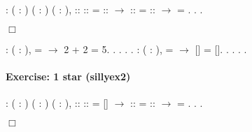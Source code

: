 \documentclass[12pt]{report}
\begin{document}
\begin{coqdoccode}
\coqdocnoindent
{}  : \coqdockw{\ensuremath{\forall}} ( : ) (   : ) (  :  ),\coqdoceol
\coqdocindent{2.50em}
 ::  ::  =  ::  \ensuremath{\rightarrow}\coqdoceol
\coqdocindent{2.50em}
 ::  =  ::  \ensuremath{\rightarrow}\coqdoceol
\coqdocindent{2.50em}
 = .\coqdoceol
\coqdocnoindent
{}.\coqdoceol
 .\coqdoceol
\end{coqdoccode}
\ensuremath{\Box} \begin{coqdoccode}
\coqdocemptyline
\coqdocnoindent
{}  : \coqdockw{\ensuremath{\forall}} ( : ),\coqdoceol
\coqdocindent{2.50em}
  =  \ensuremath{\rightarrow}\coqdoceol
\coqdocindent{2.50em}
2 + 2 = 5.\coqdoceol
\coqdocnoindent
{}.\coqdoceol
\coqdocindent{1.00em}
  .  . .\coqdoceol
\coqdocemptyline
\coqdocnoindent
{}  : \coqdockw{\ensuremath{\forall}} (  : ),\coqdoceol
\coqdocindent{2.50em}
 =  \ensuremath{\rightarrow}\coqdoceol
\coqdocindent{2.50em}
[] = [].\coqdoceol
\coqdocnoindent
{}.\coqdoceol
\coqdocindent{1.00em}
   .  . .\coqdoceol
\coqdocemptyline
\end{coqdoccode}
\paragraph{Exercise: 1 star (sillyex2)}

\begin{coqdoccode}
\coqdocnoindent
{}  : \coqdockw{\ensuremath{\forall}} ( : ) (   : ) (  :  ),\coqdoceol
\coqdocindent{2.50em}
 ::  ::  = [] \ensuremath{\rightarrow}\coqdoceol
\coqdocindent{2.50em}
 ::  =  ::  \ensuremath{\rightarrow}\coqdoceol
\coqdocindent{2.50em}
 = .\coqdoceol
\coqdocnoindent
{}.\coqdoceol
 .\coqdoceol
\end{coqdoccode}
\ensuremath{\Box} 
\end{document}
